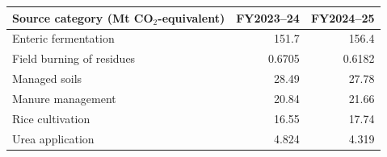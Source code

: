 \begin{tabular}{@{}p{.46\linewidth}rr@{}}\toprule
Source category (Mt CO$_2$-equivalent) & FY2023--24 & FY2024--25\\\midrule
Enteric fermentation & 151.7 & 156.4 \\
Field burning of residues & 0.6705 & 0.6182 \\
Managed soils & 28.49 & 27.78 \\
Manure management & 20.84 & 21.66 \\
Rice cultivation & 16.55 & 17.74 \\
Urea application & 4.824 & 4.319 \\
\bottomrule\end{tabular}
